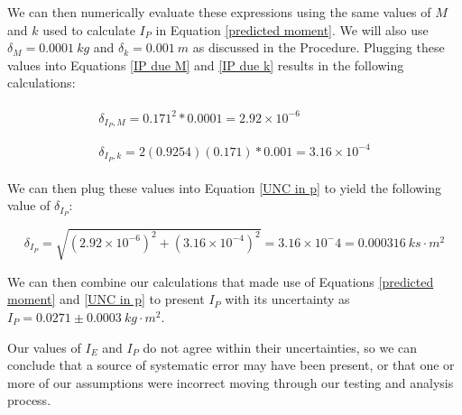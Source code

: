 \documentclass[12pt]{article}
\begin{document}
\indent We can then numerically evaluate these expressions using the same values of $M$ and $k$ used to calculate $I_P$ in Equation \ref{predicted moment}. We will also use $\delta_M=0.0001\ kg$ and $\delta_k=0.001\ m$ as discussed in the Procedure. Plugging these values into Equations \ref{IP due M} and \ref{IP due k} results in the following calculations:

\begin{align*}
    \begin{split}
        \delta_{I_P,M}=0.171^2*0.0001=2.92\times10^{-6}
    \end{split} \\ \\
    \begin{split}
        \delta_{I_P,k}=2(0.9254)(0.171)*0.001=3.16\times10^{-4}
    \end{split}
\end{align*}

\indent We can then plug these values into Equation \ref{UNC in p} to yield the following value of $\delta_{I_P}$:

\begin{equation*}
    \delta_{I_P}=\sqrt{(2.92\times10^{-6})^2+(3.16\times10^{-4})^2}=3.16\times10^-4=0.000316\ ks\cdot m^2
\end{equation*}

\indent We can then combine our calculations that made use of Equations \ref{predicted moment} and \ref{UNC in p} to present $I_P$ with its uncertainty as $I_P=0.0271\pm0.0003\ kg\cdot m^2$. \par

Our values of $I_E$ and $I_P$ do not agree within their uncertainties, so we can conclude that a source of systematic error may have been present, or that one or more of our assumptions were incorrect moving through our testing and analysis process.

\end{document}
